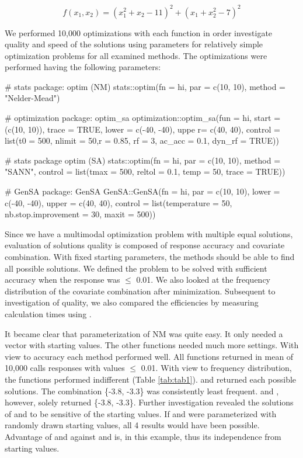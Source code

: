 \begin{equation}
\label{eq:eq2}
f(x_1,x_2)=(x_1^2+x_2-11)^2+(x_1+x_2^2-7)^2
\end{equation}

We performed 10,000 optimizations with each function in order investigate quality and speed of the solutions using parameters for relatively simple optimization problems for all examined methods. The optimizations were performed having the following parameters:

\begin{example}
# stats package: optim (NM)
stats::optim(fn = hi, par = c(10, 10), method = "Nelder-Mead")
	
# optimization package: optim_sa
optimization::optim_sa(fun = hi, start = (c(10, 10)), trace = TRUE, 
	lower = c(-40, -40), uppe r= c(40, 40),
		control = list(t0 = 500, nlimit = 50,r = 0.85,
		rf = 3, ac_acc = 0.1, dyn_rf = TRUE))

# stats package optim (SA)
stats::optim(fn = hi, par = c(10, 10), method = "SANN",
	control = list(tmax = 500, reltol = 0.1, temp = 50, trace = TRUE))

# GenSA package: GenSA
GenSA::GenSA(fn = hi, par = c(10, 10), lower = c(-40, -40), upper = c(40, 40), 
	control = list(temperature = 50, nb.stop.improvement = 30, maxit = 500))
\end{example}
Since we have a multimodal optimization problem with multiple equal solutions, evaluation of solutions quality is composed of response accuracy and covariate combination. With fixed starting parameters, the methods should be able to find all possible solutions. We defined the problem to be solved with sufficient accuracy when the response was $\leq$ 0.01. We also looked at the frequency distribution of the covariate combination after minimization. Subsequent to investigation of quality, we also compared the efficiencies by measuring calculation times using .

It became clear that parameterization of NM was quite easy. It only needed a vector with starting values. The other functions needed much more settings. With view to accuracy each method performed well. All functions returned in mean of 10,000 calls responses with values $\leq$ 0.01. With view to frequency distribution, the functions performed indifferent (Table \ref{tab:tab1}).  and  returned each possible solutions.  The combination \{-3.8, -3.3\} was consistently least frequent.  and , however, solely returned \{-3.8, -3.3\}. Further investigation revealed the solutions of  and  to be sensitive of the starting values. If  and  were parameterized with randomly drawn starting values, all 4 results would have been possible. Advantage of  and  against  and  is, in this example, thus its independence from starting values.

